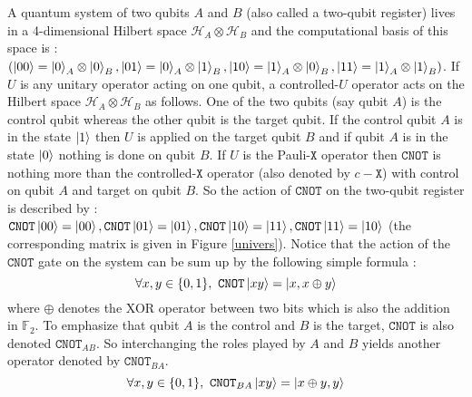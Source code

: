 \documentclass[a4paper,12pt,fleqn]{article}
\newcommand\cnot{\mathtt{CNOT}}
\newcommand\cX{c-\mathtt{X}}
\newcommand\PauliX{ Pauli-$\mathtt X$ }
\newcommand\XX{ \mathtt{X} }
\newcommand\HH{\mathcal{H}}
\newcommand\F{\mathbb{F}}
\begin{document}
A quantum system of two qubits $A$ and $B$ (also called  a two-qubit register) lives in a 4-dimensional Hilbert space $\HH_A\otimes\HH_B$ and the computational basis of this space is :
$(\ket{00}=\ket{0}_A\otimes\ket{0}_B,\ket{01}=\ket{0}_A\otimes\ket{1}_B,\ket{10}=\ket{1}_A\otimes\ket{0}_B,\ket{11}=\ket{1}_A\otimes\ket{1}_B)$.
If $U$ is any unitary operator acting on one qubit, a controlled-$U$ operator acts on the Hilbert space $\HH_{A}\otimes\HH_{B}$ as follows.
One of the two qubits (say qubit $A$) is the control qubit whereas the other qubit is the target qubit. If the control qubit $A$ is in the state $\ket 1$ then $U$ is applied on the target qubit $B$ and if qubit $A$ is in the state $\ket{0}$ nothing is done on qubit $B$. If $U$ is the \PauliX operator then $\cnot$ is nothing more than the controlled-$\XX$ operator
(also denoted by $\cX$) with control on qubit $A$ and target on qubit $B$. So the action of $\cnot$ on the two-qubit register is described by :
$\cnot\ket{00}=\ket{00}, \cnot\ket{01}=\ket{01}, \cnot\ket{10}=\ket{11}, \cnot\ket{11}=\ket{10}$ (the corresponding matrix is given in Figure \ref{univers}).
Notice that the action of the $\cnot$ gate on the system can be sum up by the following simple formula :
\begin{equation}\label{cnotxy}
  \forall x,y\in\{0,1\}, \ \cnot\ket{xy}=\ket{x,x \oplus y}
\end{equation}
where $\oplus$ denotes the XOR operator between two bits which is also the addition in $\F_2$. To emphasize that qubit $A$ is the control and $B$ is the target, $\cnot$ is also denoted $\cnot_{AB}$. So interchanging the roles played by $A$ and $B$ yields another operator denoted by $\cnot_{BA}$.
\begin{equation}
\forall x,y\in\{0,1\}, \ \cnot_{BA}\ket{xy}=\ket{x\oplus y,y}\label{cnotBA}
\end{equation}
\end{document}
